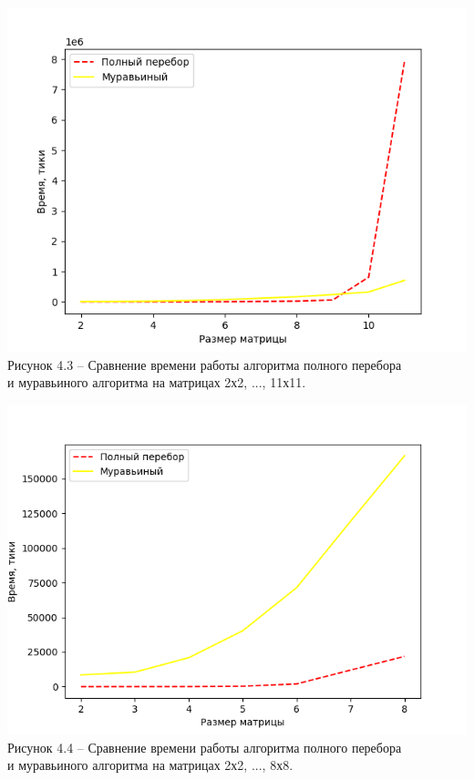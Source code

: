\documentclass[12pt]{report}
\begin{document}
\begin{center}
	\label{img:graph} 
	\includegraphics[scale = 0.9]{graph} \\ Рисунок 4.3 -- Сравнение времени работы алгоритма полного перебора \\и муравьиного алгоритма на матрицах 2х2, ..., 11х11.
\end{center}

\begin{center}
	\label{img:graph2} 
	\includegraphics[scale = 0.94]{graph2} \\ Рисунок 4.4 -- Сравнение времени работы алгоритма полного перебора \\и муравьиного алгоритма на матрицах 2х2, ..., 8х8.
\end{center}
\end{document}
